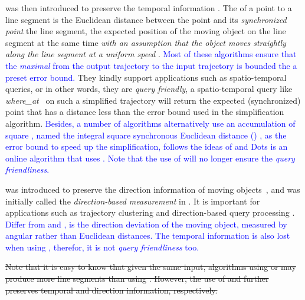{ \sed was then introduced to preserve the temporal information \cite{Meratnia:Spatiotemporal,Cao:Spatio}.
The \sed of a point to a line segment is the Euclidean distance between the point and its \emph{synchronized point} \wrt the line segment, the expected position of the moving object on the line segment at the same time \emph{with an assumption that the object moves straightly along the line segment at a uniform speed} \cite{Cao:Spatio}. \textcolor{blue}{Most of these algorithms ensure that the \emph{maximal} \sed from the output trajectory to the input trajectory is bounded the a preset error bound.} They kindly support applications such as spatio-temporal queries, or in other words, they are \emph{query friendly}, \ie a spatio-temporal query like \emph{where\_at}~\cite{Cao:Spatio} on such a simplified trajectory will return the expected (synchronized) point that has a distance less than the error bound used in the simplification algorithm.
%
\textcolor{blue}{Besides, a number of algorithms \cite{Chen:Fast, Wu:Graph,Cao:Dots} alternatively use an accumulation of square \sed, named the integral square synchronous Euclidean distance () \cite{Chen:Fast}, as the error bound to speed up the simplification, \cite{Wu:Graph} follows the ideas of \cite{Chen:Fast} and Dots \cite{Cao:Dots} is an online algorithm that uses .
Note that the use of  will no longer ensure the \emph{query friendliness}.}


\dad was introduced to preserve the direction information of moving objects~\cite{Long:Direction, Zhang:Evaluation}, and was initially called the \emph{direction-based measurement} in \cite{Long:Direction}. 
It is important for applications such as trajectory clustering and direction-based query processing \cite{Long:Direction,Long:Mining}.
\textcolor{blue}{Differ from \ped and \sed, \dad is the direction deviation of the moving object, measured by angular rather than Euclidean distances.}
\textcolor{blue}{The temporal information is also lost when using \dad, therefor, it is not \emph{query friendliness} too.}

%
\sout{Note that it is easy to know that given the same input, \lsa algorithms using \sed or \dad may produce more line segments than using \ped. However, the use of \sed and \dad further preserves temporal and direction information, respectively.}


}
